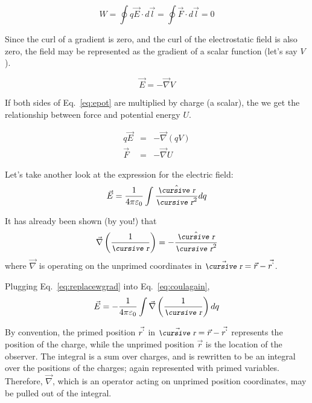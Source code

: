 \documentclass[12pt]{article}
\begin{document}
\begin{flushleft}
\begin{equation}
W = \oint q\vec{E} \cdot  d\vec{l} = \oint \vec{F} \cdot  d\vec{l} = 0 
\label{eq:work}
\end{equation}

Since the curl of a gradient is zero, and the curl of the electrostatic field is also zero, the field may be  represented as the gradient of a scalar function (let's say $V$).  

\begin{equation}
\vec{E} = -\vec{\nabla} V
\label{eq:epot}
\end{equation}

If both sides of Eq.~\ref{eq:epot} are multiplied by charge (a scalar), the we get the relationship between force and potential energy $U$.

\begin{eqnarray*}
q\vec{E} & = & -\vec{\nabla} (qV) \\
\vec{F} & = & -\vec{\nabla} U 
\end{eqnarray*}

Let's take another look at the expression for the electric field:
\begin{equation}
\vec{E}=\frac{1}{4\pi \varepsilon_{0}} \int \frac{ \hat{\text{\small\slshape\cursive r}} }{\text{\small\slshape\cursive r}^{2}} dq 
\label{eq:coulagain}
\end{equation}

It has already been shown (by you!) that
\begin{equation}
\vec{\nabla} \left( \frac{1}{\text{\small\slshape\cursive r}} \right) = -\frac{\hat{\text{\small\slshape\cursive r}}}{\text{\small\slshape\cursive r}^{2}}
\label{eq:replacewgrad}
\end{equation}
where $\vec{\nabla}$ is operating on the unprimed coordinates in $\vec{\text{\small\slshape\cursive r}}=\vec{r}-\vec{r^{`}}$.  

Plugging Eq.~\ref{eq:replacewgrad} into Eq.~\ref{eq:coulagain},
\begin{equation*}
\vec{E}=-\frac{1}{4\pi \varepsilon_{0}} \int  \vec{\nabla} \left( \frac{1}{\text{\small\slshape\cursive r}} \right) dq 
\end{equation*}

By convention, the primed position $\vec{r^{`}}$ in $\vec{\text{\small\slshape\cursive r}}=\vec{r}-\vec{r^{`}}$ represents the position of the charge, while the unprimed position $\vec{r}$ is the location of the observer.  The integral is a sum over charges, and is rewritten to be an integral over the positions of the charges; again represented with primed variables.  Therefore, $\vec{\nabla}$, which is an operator acting on unprimed position coordinates, may be pulled out of the integral.


\end{flushleft}
\end{document}
